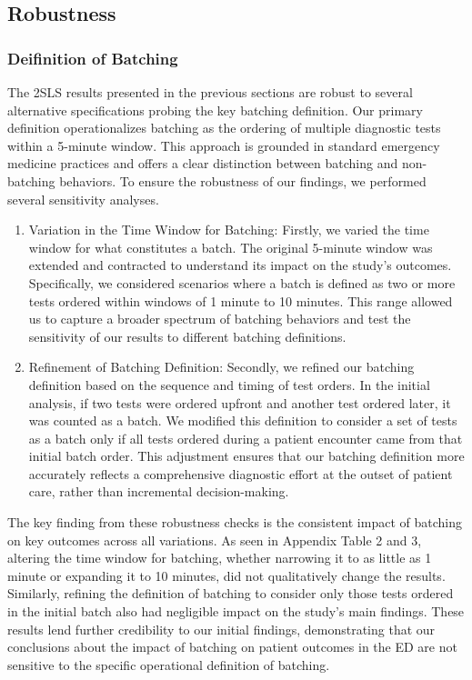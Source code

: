 \documentclass[,,nonblindrev]{informs}
\begin{document}
\hypertarget{robustness}{%
\subsection{Robustness}\label{robustness}}

\hypertarget{deifinition-of-batching}{%
\subsubsection{Deifinition of Batching}\label{deifinition-of-batching}}

The 2SLS results presented in the previous sections are robust to
several alternative specifications probing the key batching definition.
Our primary definition operationalizes batching as the ordering of
multiple diagnostic tests within a 5-minute window. This approach is
grounded in standard emergency medicine practices and offers a clear
distinction between batching and non-batching behaviors. To ensure the
robustness of our findings, we performed several sensitivity analyses.

\begin{enumerate}
\def\labelenumi{(\arabic{enumi})}
\item
  Variation in the Time Window for Batching: Firstly, we varied the time
  window for what constitutes a batch. The original 5-minute window was
  extended and contracted to understand its impact on the study's
  outcomes. Specifically, we considered scenarios where a batch is
  defined as two or more tests ordered within windows of 1 minute to 10
  minutes. This range allowed us to capture a broader spectrum of
  batching behaviors and test the sensitivity of our results to
  different batching definitions.
\item
  Refinement of Batching Definition: Secondly, we refined our batching
  definition based on the sequence and timing of test orders. In the
  initial analysis, if two tests were ordered upfront and another test
  ordered later, it was counted as a batch. We modified this definition
  to consider a set of tests as a batch only if all tests ordered during
  a patient encounter came from that initial batch order. This
  adjustment ensures that our batching definition more accurately
  reflects a comprehensive diagnostic effort at the outset of patient
  care, rather than incremental decision-making.
\end{enumerate}

The key finding from these robustness checks is the consistent impact of
batching on key outcomes across all variations. As seen in Appendix
Table 2 and 3, altering the time window for batching, whether narrowing
it to as little as 1 minute or expanding it to 10 minutes, did not
qualitatively change the results. Similarly, refining the definition of
batching to consider only those tests ordered in the initial batch also
had negligible impact on the study's main findings. These results lend
further credibility to our initial findings, demonstrating that our
conclusions about the impact of batching on patient outcomes in the ED
are not sensitive to the specific operational definition of batching.
\end{document}
